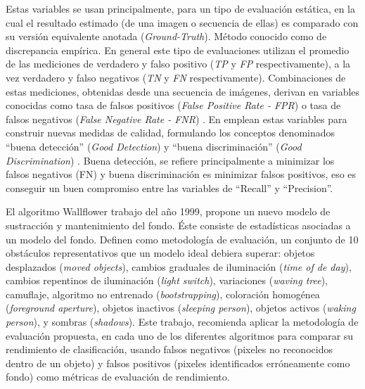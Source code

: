 \indent Estas variables se usan principalmente, para un tipo de evaluación estática, en la cual el resultado estimado (de una imagen o secuencia de ellas) es comparado con su versión equivalente anotada (\textit{Ground-Truth}). Método conocido como de discrepancia empírica. En general este tipo de evaluaciones utilizan el promedio de las mediciones de verdadero y falso positivo (\textit{TP} y \textit{FP} respectivamente), a la vez verdadero y falso negativos (\textit{TN} y \textit{FN} respectivamente). Combinaciones de estas mediciones, obtenidas desde una secuencia de imágenes, derivan en variables conocidas como tasa de falsos positivos (\textit{False Positive Rate - FPR}) o tasa de falsos negativos (\textit{False Negative Rate - FNR}) \cite{liu_metrics_2011}. En \cite{prati_detecting_2003} emplean estas variables para construir nuevas medidas de calidad, formulando los conceptos denominados ``buena detección'' (\textit{Good Detection}) y ``buena discriminación'' (\textit{Good Discrimination}) \cite{prati_detecting_2003}. Buena detección, se refiere principalmente a minimizar los falsos negativos (FN) y buena discriminación es minimizar falsos positivos, eso es conseguir un buen compromiso entre las variables de ``Recall'' y ``Precision''.

\indent El algoritmo Wallflower\cite{toyama_wallflower_1999} trabajo del año 1999, propone un nuevo modelo de sustracción y mantenimiento del fondo. Éste consiste de estadísticas asociadas a un modelo del fondo. Definen como metodología de evaluación, un conjunto de 10 obstáculos representativos que un modelo ideal debiera superar: objetos desplazados (\textit{moved objects}), cambios graduales de iluminación (\textit{time of de day}), cambios repentinos de iluminación (\textit{light switch}), variaciones (\textit{waving tree}), camuflaje, algoritmo no entrenado (\textit{bootstrapping}), coloración homogénea (\textit{foreground aperture}), objetos inactivos (\textit{sleeping person}), objetos activos (\textit{waking person}), y sombras (\textit{shadows}). Este trabajo, recomienda aplicar la metodología de evaluación propuesta, en cada uno de los diferentes algoritmos para comparar su rendimiento de clasificación, usando falsos negativos (pixeles no reconocidos dentro de un objeto) y falsos positivos (pixeles identificados erróneamente como fondo) como métricas de evaluación de rendimiento.

